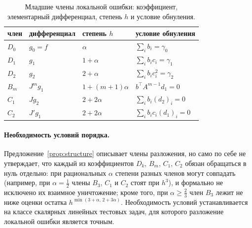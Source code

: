 \documentclass[11pt,a4paper]{article}
\theoremstyle{plain}
\theoremstyle{definition}
\begin{document}
\begin{table}[ht]
\centering\small
\caption{Младшие члены локальной ошибки: коэффициент, элементарный дифференциал, степень $h$ и условие обнуления.}\label{tab:terms}
\begin{tabular}{llll}
\toprule
член & дифференциал & степень $h$ & условие обнуления\\
\midrule
$D_0$ & $g_0=f$ & $\alpha$ & $\sum_ib_i=\gamma_0$\\
$D_1$ & $g_1$ & $1+\alpha$ & $\sum_ib_ic_i=\gamma_1$\\
$D_2$ & $g_2$ & $2+\alpha$ & $\sum_ib_ic_i^2=\gamma_2$\\
$B_m$ & $J^mg_1$ & $1+(m+1)\alpha$ & $b^{\top}A^{m-1}d_1=0$\\
$C_1$ & $Jg_2$ & $2+2\alpha$ & $\sum_ib_i(d_2)_i=0$\\
$C_2$ & $J'g_1$ & $2+2\alpha$ & $\sum_ib_ic_i(d_1)_i=0$\\
\bottomrule
\end{tabular}
\end{table}

\paragraph{Необходимость условий порядка.} Предложение~\ref{prop:structure} описывает члены разложения, но само по себе не утверждает, что каждый из коэффициентов $D_k$, $B_m$, $C_1$, $C_2$ обязан обращаться в нуль отдельно: при рациональных $\alpha$ степени разных членов могут совпадать (например, при $\alpha=\frac12$ члены $B_3$, $C_1$ и $C_2$ стоят при $h^3$), и формально не исключено их взаимное уничтожение; кроме того, при $\alpha\ge\frac23$ член $B_3$ лежит не ниже оценки остатка $h^{\min(3+\alpha,\,2+3\alpha)}$. Необходимость условий устанавливается на классе скалярных линейных тестовых задач, для которого разложение локальной ошибки является точным.
\end{document}
